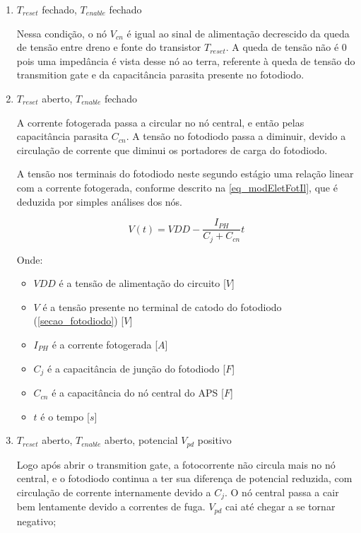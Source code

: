 \begin{enumerate}

\item \emph{$T_{reset}$} fechado, \emph{$T_{enable}$} fechado
    
Nessa condição, o n\'o $V_{cn}$ \'e igual ao sinal de alimentação decrescido da queda de tensão entre dreno e fonte do transistor $T_{reset}$. A queda de tensão n\~ao \'e 0 pois uma impedância \'e vista desse nó ao terra, referente à queda de tensão do transmition gate e da capacitância parasita presente no fotodiodo.

\item \emph{$T_{reset}$} aberto, \emph{$T_{enable}$} fechado

A corrente fotogerada passa a circular no nó central, e então pelas capacitância parasita \emph{$C_{cn}$}. A tensão no fotodiodo passa a diminuir, devido a circulação de corrente que diminui os portadores de carga do fotodiodo.

A tens\~ao nos terminais do fotodiodo neste segundo est\'agio uma rela{\c c}\~ao linear com a corrente fotogerada, conforme descrito na \autoref{eq_modEletFotIl}, que \'e deduzida por simples an\'alises dos n\'os.

\begin{equation}
    \label{eq_modEletFotIl}
    V(t) = VDD-\frac{I_{PH}}{C_j+C_{cn}}t
\end{equation}

Onde:

\begin{itemize}
    \item $VDD$ \'e a tens\~ao de alimenta{\c c}\~ao do circuito [$V$]
    \item $V$ \'e a tens\~ao presente no terminal de catodo do fotodiodo (\autoref{secao_fotodiodo}) [$V$]
    \item $I_{PH}$ \'e a corrente fotogerada [$A$]
    \item $C_j$ \'e a capacit\^ancia de jun{\c c}\~ao do fotodiodo [$F$]
    \item $C_{cn}$ \'e a capacit\^ancia do n\'o central do APS [$F$]
    \item $t$ \'e o tempo [$s$]
\end{itemize}

\item \emph{$T_{reset}$} aberto, \emph{$T_{enable}$} aberto, potencial \emph{$V_{pd}$} positivo

Logo ap\'os abrir o transmition gate, a fotocorrente n\~ao circula mais no n\'o central, e o fotodiodo continua a ter sua diferen{\c c}a de potencial reduzida, com circula{\c c}\~ao de corrente internamente devido a \emph{$C_j$}. O n\'o central passa a cair bem lentamente devido a correntes de fuga. \emph{$V_{pd}$} cai at\'e chegar a se tornar negativo;


\end{enumerate}
